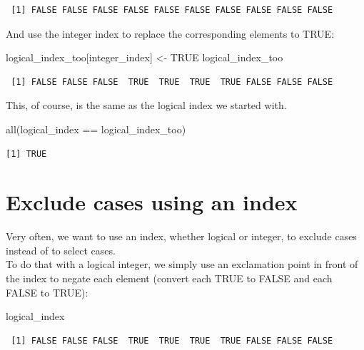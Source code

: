 \documentclass[
]{book}
\newenvironment{Shaded}{\begin{snugshade}}{\end{snugshade}}
\newcommand{\ConstantTok}[1]{\textcolor[rgb]{0.00,0.00,0.00}{#1}}
\newcommand{\FunctionTok}[1]{\textcolor[rgb]{0.00,0.00,0.00}{#1}}
\newcommand{\NormalTok}[1]{#1}
\newcommand{\OtherTok}[1]{\textcolor[rgb]{0.56,0.35,0.01}{#1}}
\newcommand{\SpecialCharTok}[1]{\textcolor[rgb]{0.00,0.00,0.00}{#1}}
\begin{document}
\begin{verbatim}
 [1] FALSE FALSE FALSE FALSE FALSE FALSE FALSE FALSE FALSE FALSE
\end{verbatim}

And use the integer index to replace the corresponding elements to TRUE:

\begin{Shaded}
\begin{Highlighting}[]
\NormalTok{logical\_index\_too[integer\_index] }\OtherTok{\textless{}{-}} \ConstantTok{TRUE}
\NormalTok{logical\_index\_too}
\end{Highlighting}
\end{Shaded}

\begin{verbatim}
 [1] FALSE FALSE FALSE  TRUE  TRUE  TRUE  TRUE FALSE FALSE FALSE
\end{verbatim}

This, of course, is the same as the logical index we started with.

\begin{Shaded}
\begin{Highlighting}[]
\FunctionTok{all}\NormalTok{(logical\_index }\SpecialCharTok{==}\NormalTok{ logical\_index\_too)}
\end{Highlighting}
\end{Shaded}

\begin{verbatim}
[1] TRUE
\end{verbatim}

\hypertarget{exclude-cases-using-an-index}{%
\section{Exclude cases using an index}\label{exclude-cases-using-an-index}}

Very often, we want to use an index, whether logical or integer, to exclude cases instead of to select cases.\\
To do that with a logical integer, we simply use an exclamation point in front of the index to negate each element (convert each TRUE to FALSE and each FALSE to TRUE):

\begin{Shaded}
\begin{Highlighting}[]
\NormalTok{logical\_index}
\end{Highlighting}
\end{Shaded}

\begin{verbatim}
 [1] FALSE FALSE FALSE  TRUE  TRUE  TRUE  TRUE FALSE FALSE FALSE
\end{verbatim}
\end{document}
